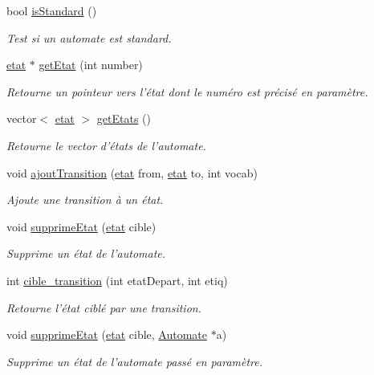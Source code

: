 \begin{DoxyCompactItemize}
bool \hyperlink{class_automate_a763c4f441c8e0740a5ed0fbe16360a73}{is\-Standard} ()
\begin{DoxyCompactList}\small\item\em Test si un automate est standard. \end{DoxyCompactList}\item 
\hyperlink{classetat}{etat} $\ast$ \hyperlink{class_automate_a62ebaf51904bf539f74e87db01826999}{get\-Etat} (int number)
\begin{DoxyCompactList}\small\item\em Retourne un pointeur vers l'état dont le numéro est précisé en paramètre. \end{DoxyCompactList}\item 
vector$<$ \hyperlink{classetat}{etat} $>$ \hyperlink{class_automate_a656b9bc8d5daedee113b6429662b5d98}{get\-Etats} ()
\begin{DoxyCompactList}\small\item\em Retourne le vector d'états de l'automate. \end{DoxyCompactList}\item 
void \hyperlink{class_automate_a74a66bbf357d7fdd19f1d258ef3d2704}{ajout\-Transition} (\hyperlink{classetat}{etat} from, \hyperlink{classetat}{etat} to, int vocab)
\begin{DoxyCompactList}\small\item\em Ajoute une transition à un état. \end{DoxyCompactList}\item 
void \hyperlink{class_automate_a6456b3b223086aea9e4efa5ae35af931}{supprime\-Etat} (\hyperlink{classetat}{etat} cible)
\begin{DoxyCompactList}\small\item\em Supprime un état de l'automate. \end{DoxyCompactList}\item 
int \hyperlink{class_automate_ae1852a4e9b030309bc29b96cf67e1abf}{cible\-\_\-transition} (int etat\-Depart, int etiq)
\begin{DoxyCompactList}\small\item\em Retourne l'état ciblé par une transition. \end{DoxyCompactList}\item 
void \hyperlink{class_automate_a5d258956a3a0a655cf0e2ac233156651}{supprime\-Etat} (\hyperlink{classetat}{etat} cible, \hyperlink{class_automate}{Automate} $\ast$a)
\begin{DoxyCompactList}\small\item\em Supprime un état de l'automate passé en paramètre. \end{DoxyCompactList}\item 

\end{DoxyCompactItemize}
